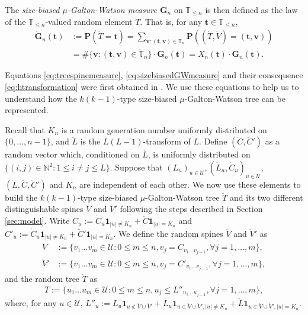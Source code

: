 \documentclass[12pt,a4paper]{amsart}
\numberwithin{equation}{section}
\begin{document}
	The \emph{size-biased $\mu$-Galton-Watson measure $\dot {\mathbf G}_n$} on $\mathbb T_{\leq n}$ is then defined as the law of the $\mathbb T_{\leq n}$-valued random element $\dot T$. That is, for any $ \mathbf t \in\mathbb T_{\leq n}$,
\begin{equation}
\label{eq:sizebiasedGWmeasure}
\begin{split}
		\dot {\mathbf G}_n( \mathbf t )
	&:= \mathbf P(\dot T= \mathbf t )
	= \sum_{ \mathbf v:( \mathbf t , \mathbf v)\in \dot{\mathbb T}_n} \mathbf P((\dot T,\dot V)=( \mathbf t , \mathbf v))
	\\&= \#\{ \mathbf v:( \mathbf t , \mathbf v)\in \dot{\mathbb T}_n\} \cdot \mathbf G_n( \mathbf t )
	= X_n( \mathbf t ) \cdot \mathbf G_n( \mathbf t ).
\end{split}
\end{equation}

	Equations \eqref{eq:treespinemeasure}, \eqref{eq:sizebiasedGWmeasure} and their consequence \eqref{eq:htransformation} were first obtained in \cite{lyons1995conceptual}.
	We use these equations to help us to understand how the $k(k-1)$-type size-biased $\mu$-Galton-Watson tree can be represented.
	
	Recall that $K_n$ is a random generation number uniformly distributed on $\{0,\dots,n-1\}$, and 
$\ddot L$ is the $L(L-1)$-transform of $L$.
	Define $(\ddot C,\ddot C')$ as a random vector which, conditioned on $\ddot L$, is uniformly distributed on $\{(i,j)\in\mathbb N^2:1\leq i\neq j\leq \ddot L\}$.
	Suppose that $(L_u)_{u\in\mathcal U}, (\dot L_u,\dot C_u)_{u\in \mathcal U}$, $(\ddot L,\ddot C,\ddot C')$ and $K_n$ are independent of each other.
	We now use these elements to build the $k(k-1)$-type size-biased $\mu$-Galton-Watson tree $\ddot T$ and its two different distinguishable spines $\ddot V$ and $\ddot V'$ following the steps described in Section \ref{sec:model}.
	Write $C_u:=\dot C_u\mathbf 1_{|u|\neq K_n}+\ddot C\mathbf 1_{|u|=K_n}$ and $C'_u:=\dot C_u\mathbf 1_{|u|\neq K_n}+\ddot C'\mathbf 1_{|u|=K_n}$.
	We define the random spines $\ddot V$ and $\ddot V'$ as
\begin{align*}
        \ddot V
	&:= \{v_1\dots v_m\in \mathcal U:0\le m\le n, v_j= C_{v_1\dots v_{j-1}},\forall j=1,\dots,m\},
	\\ \ddot V'
	&:= \{v_1\dots v_m\in \mathcal U:0\le m \le n, v_j= C'_{v_1\dots v_{j-1}},\forall j=1,\dots,m\},
\end{align*}
	and the random tree $\ddot T$ as
\begin{equation*}
	    \ddot T
	:=
		\{u_1\dots u_m\in\mathcal U: 0\le m\le n,u_j\leq L''_{u_1\dots u_{j-1}},\forall j=1,\dots,m\},
\end{equation*}
	where, for any $u\in\mathcal U$, $L''_u:=L_u \mathbf 1_{u\not\in \ddot V\cup\ddot V'}+\dot L_u \mathbf 1_{u\in \ddot V\cup\ddot V',|u|\neq K_n}+\ddot L\mathbf 1_{u\in \ddot V\cup\ddot V',|u|=K_n}$.
\end{document}

